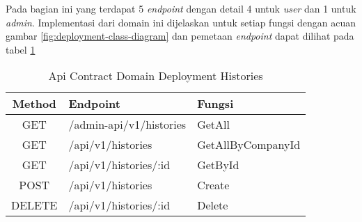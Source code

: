 Pada bagian ini yang terdapat 5 \textit{endpoint} dengan detail 4 untuk \textit{user} dan 1 untuk \textit{admin}. Implementasi dari domain ini dijelaskan untuk setiap fungsi dengan acuan gambar \ref{fig:deployment-class-diagram} dan pemetaan \textit{endpoint} dapat dilihat pada tabel \ref{tab:api-contract-domain-deployment-histories}

\bgroup
\begin{table}[ht]
  \caption{Api Contract Domain Deployment Histories}
  \label{tab:api-contract-domain-deployment-histories}
  \def\arraystretch{1.7}
  \centering
  \begin{tabular}{|c|p{6cm}|p{4cm}|}
    \hline
    Method & Endpoint                &
    Fungsi                                               \\
    \hline
    GET    & /admin-api/v1/histories & GetAll            \\
    \hline
    GET    & /api/v1/histories       & GetAllByCompanyId \\
    \hline
    GET    & /api/v1/histories/:id   & GetById           \\
    \hline
    POST   & /api/v1/histories       & Create            \\
    \hline
    DELETE & /api/v1/histories/:id   & Delete            \\
    \hline
  \end{tabular}
\end{table}
\egroup


